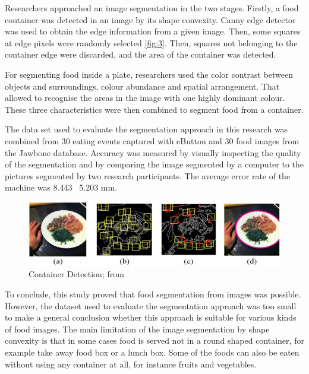 Researchers approached an image segmentation in the two stages. Firstly, a food container was detected in an image by its shape convexity. Canny edge detector was used to obtain the edge information from a given image. Then, some squares at edge pixels were randomly selected \autoref{fig:3}. Then, squares not belonging to the container edge were discarded, and the area of the container was detected.

For segmenting food inside a plate, researchers used the color contrast between objects and surroundings, colour abundance and spatial arrangement. That allowed to recognise the areas in the image with one highly dominant colour. These three characteristics were then combined to segment food from a container.

The data set used to evaluate the segmentation approach in this research was combined from 30 eating events captured with eButton and 30 food images from the Jawbone database. Accuracy was measured by visually inspecting the quality of the segmentation and by comparing the image segmented by a computer to the pictures segmented by two research participants. The average error rate of the machine was  8.443 \pm\ 5.203 mm. 



\begin{figure}[ht]
\includegraphics{Figures/2/segm_03.jpg}
\caption{Container Detection;  from \citep{chen2015saliency}}
\label{fig:3}
\end{figure}
To conclude, this study proved that food segmentation from images was possible. However, the dataset used to evaluate the segmentation approach was too small to make a general conclusion whether this approach is suitable for various kinds of food images.
The main limitation of the image segmentation by shape convexity is that in some cases food is served not in a round shaped container, for example take away food box or a lunch box. Some of the foods can also be eaten without using any container at all, for instance fruits and vegetables.

